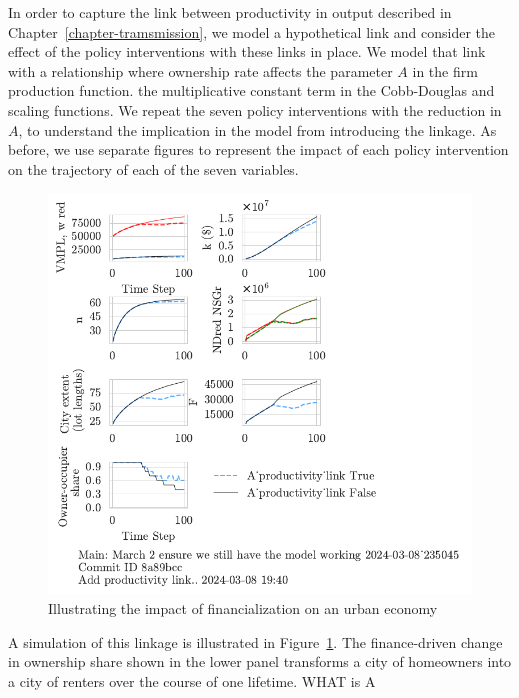 In order to capture the link between productivity in output described in Chapter~\ref{chapter-tramsmission}, we model a hypothetical link and consider the effect of the policy interventions with these links in place. We model that link with a relationship where ownership rate affects the parameter $A$ in the firm production function. the 
multiplicative constant term in the Cobb-Douglas and scaling functions. 
We repeat the seven policy interventions with the %
reduction in $A$, to understand the implication in the model from introducing the linkage. 
As before, we use separate figures to represent the impact of each policy intervention on the trajectory of each of the seven variables. 

\begin{figure}[h!tb]\label{fig-impact-channel-example}
    \centering
    \includegraphics[scale=1, trim=.25cm 2cm .25cm .25cm, clip]{fig/productivity_link.pdf}
    \caption{Illustrating the impact of financialization on an urban economy}
\end{figure}

A simulation of this linkage is illustrated in Figure~\ref{fig-impact-channel-example}. The finance-driven change in ownership share shown in the lower panel transforms a city of homeowners into a city of renters over the course of one lifetime. 
WHAT is A

